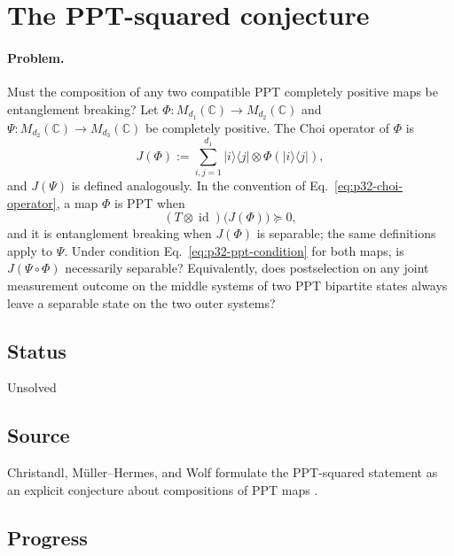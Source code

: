 \section{The PPT-squared conjecture}
\label{sec:problem-32}

\paragraph{Problem.}
Must the composition of any two compatible PPT completely positive maps be
entanglement breaking?  Let
$\Phi:M_{d_1}(\mathbb C)\to M_{d_2}(\mathbb C)$ and
$\Psi:M_{d_2}(\mathbb C)\to M_{d_3}(\mathbb C)$ be completely positive.  The
Choi operator of $\Phi$ is
\begin{equation}
  J(\Phi)
  :=\sum_{i,j=1}^{d_1}\lvert i\rangle\!\langle j\rvert
       \otimes\Phi(\lvert i\rangle\!\langle j\rvert),
  \label{eq:p32-choi-operator}
\end{equation}
and $J(\Psi)$ is defined analogously.  In the convention of
Eq.~\eqref{eq:p32-choi-operator}, a map $\Phi$ is PPT when
\begin{equation}
  (T\otimes\operatorname{id})\bigl(J(\Phi)\bigr)\succeq0,
  \label{eq:p32-ppt-condition}
\end{equation}
and it is entanglement breaking when $J(\Phi)$ is separable; the same
definitions apply to $\Psi$.  Under condition
Eq.~\eqref{eq:p32-ppt-condition} for both maps, is
$J(\Psi\circ\Phi)$ necessarily separable?  Equivalently, does postselection
on any joint measurement outcome on the middle systems of two PPT bipartite
states always leave a separable state on the two outer systems?

\subsection*{Status}

Unsolved

\subsection*{Source}

Christandl, M\"uller--Hermes, and Wolf formulate the PPT-squared statement as
an explicit conjecture about compositions of PPT maps
.

\subsection*{Progress}


